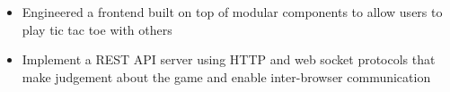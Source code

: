 
\begin{itemize}
  \item Engineered a frontend built on top of modular components
  to allow users to play tic tac toe with others
  \item Implement a REST API server using HTTP and web socket protocols that
  make judgement about the game and enable inter-browser communication
\end{itemize}

